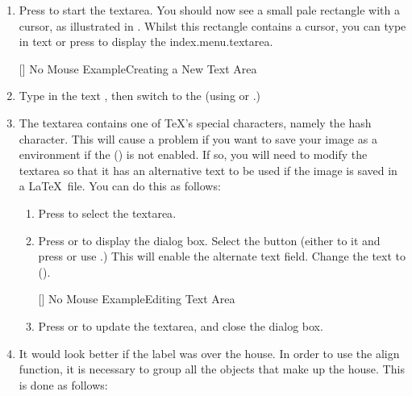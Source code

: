 \begin{enumerate}
\item Press  to start the
\gls{textarea}.  You should now see a small pale rectangle with a
cursor, as illustrated in . Whilst
this rectangle contains a cursor, you can type in text or press
 to display the \gls{index.menu.textarea}.

[]
{}
{No Mouse Example\dash Creating a New Text Area}

\item Type in the text , then switch to the
 (using  or .)

\item The \gls{textarea} contains one of \TeX's special characters,
namely the \gls{hash} character. This will cause a problem if you want
to save your image as a  environment if the
 () is
not enabled. If so, you will need to modify the \gls{textarea} so
that it has an alternative text to be used if the image is saved in
a \LaTeX\ file. You can do this as follows:

\begin{enumerate}
\item Press  to select the \gls{textarea}.

\item Press  or
to display the  dialog box. Select the
 button (either  to it and
press  or use .) This will enable
the alternate text field. Change the text to 
().

[]
{}
{No Mouse Example\dash Editing Text Area}

\item Press  or  to update the
\gls{textarea}, and close the dialog box.
\end{enumerate}

\item It would look better if the label was  over the
house. In order to use the align function, it is necessary to
\gls{group} all the objects that make up the house. This is done as
follows:


\end{enumerate}
